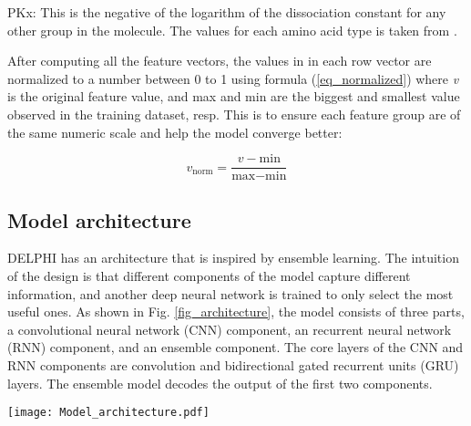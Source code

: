 \documentclass{bioinfo}
\begin{document}
\begin{methods}
PKx: This is the negative of the logarithm of the dissociation constant for any other group in the molecule. The values for each amino acid type is taken from \citep{zhang2019sequence}.

After computing all the feature vectors, the values in in each row vector are normalized to a number between 0 to 1 using formula (\ref{eq_normalized}) where \textit{v} is the original feature value, and max and min are the biggest and smallest value observed in the training dataset, resp. This is to ensure each feature group are of the same numeric scale and help the model converge better:

\begin{equation}
v_\text{norm}=\dfrac{v-\text{min}}{\text{max}-\text{min}}\label{eq_normalized}
\end{equation}

\subsection{Model architecture}
DELPHI has an architecture that is inspired by ensemble learning. The intuition of the design is that different components of the model capture different information, and another deep neural network is trained to only select the most useful ones. As shown in Fig. \ref{fig_architecture}, the model consists of three parts, a convolutional neural network (CNN) component, an recurrent neural network (RNN) component, and an ensemble component. The core layers of the CNN and RNN components are convolution and bidirectional gated recurrent units (GRU) layers. The ensemble model decodes the output of the first two components.  
\begin{figure*}
\centering
\texttt{[image: Model\_architecture.pdf]}
  \caption{\textbf{The architecture of DELPHI.} Left: the CNN component of the model. Middle: the RNN component of the model. Right: The ensemble model. 
  \label{fig_architecture}}
\end{figure*}


\end{methods}
\end{document}
